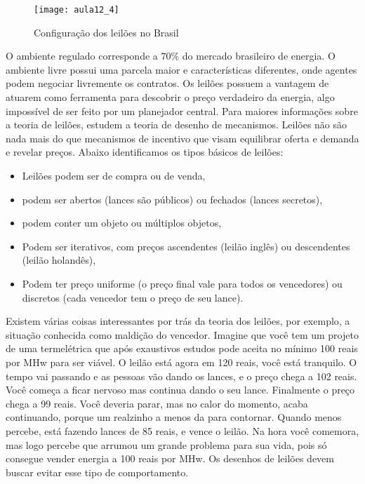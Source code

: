 \begin{figure}[H]
\begin{centering}
\texttt{[image: aula12\_4]}\protect\caption{\label{fig:aula12_4} Configuração dos leilões no Brasil}
\end{centering}
\end{figure}

O ambiente regulado corresponde a $70\%$ do mercado brasileiro de energia. O ambiente livre possui uma parcela maior e características diferentes, onde agentes podem negociar livremente os contratos. Os leilões possuem a vantagem de atuarem como ferramenta para descobrir o preço verdadeiro da energia, algo impossível de ser feito por um planejador central. Para maiores informações sobre a teoria de leilões, estudem a teoria de desenho de mecanismos. Leilões não são nada mais do que mecanismos de incentivo que visam equilibrar oferta e demanda e revelar preços. Abaixo identificamos os tipos básicos de leilões:

\begin{itemize}
\item Leilões podem ser de compra ou de venda,
\item podem ser abertos (lances são públicos) ou fechados (lances secretos),
\item podem conter um objeto ou múltiplos objetos,
\item Podem ser iterativos, com preços ascendentes (leilão inglês) ou descendentes (leilão holandês),
\item Podem ter preço uniforme (o preço final vale para todos os vencedores) ou discretos (cada vencedor tem o preço de seu lance).
\end{itemize}

Existem várias coisas interessantes por trás da teoria dos leilões, por exemplo, a situação conhecida como maldição do vencedor. Imagine que você tem um projeto de uma termelétrica que após exaustivos estudos pode aceita no mínimo 100 reais por MHw para ser viável. O leilão está agora em 120 reais, você está tranquilo. O tempo vai passando e as pessoas vão dando os lances, e o preço chega a 102 reais. Você começa a ficar nervoso mas continua dando o seu lance. Finalmente o preço chega a 99 reais. Você deveria parar, mas no calor do momento, acaba continuando, porque um realzinho a menos da para contornar. Quando menos percebe, está fazendo lances de 85 reais, e vence o leilão. Na hora você comemora, mas logo percebe que arrumou um grande problema para sua vida, pois só consegue vender energia a 100 reais por MHw. Os desenhos de leilões devem buscar evitar esse tipo de comportamento. 

